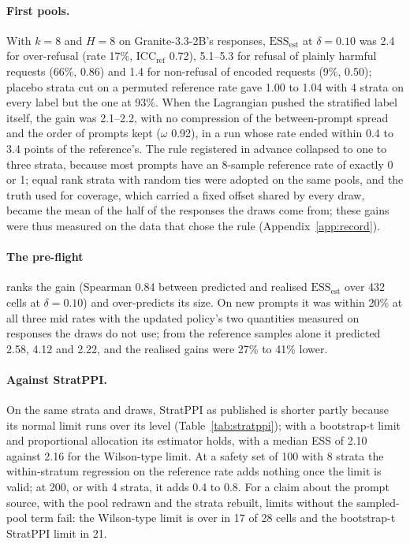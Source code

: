 \paragraph{First pools.} With $k=8$ and $H=8$ on Granite-3.3-2B's responses, $\mathrm{ESS}_{\text{est}}$ at $\delta=0.10$
was 2.4 for over-refusal (rate 17\%, $\mathrm{ICC}_{\text{ref}}$ 0.72), 5.1--5.3 for refusal of plainly harmful requests
(66\%, 0.86) and 1.4 for non-refusal of encoded requests (9\%, 0.50); placebo strata cut on a permuted reference rate gave
1.00 to 1.04 with 4 strata on every label but the one at 93\%. When the Lagrangian pushed the stratified label itself,
the gain was 2.1--2.2, with no compression of the between-prompt spread and the order of prompts kept ($\omega$ 0.92),
in a run whose rate ended within 0.4 to 3.4 points of the reference's. The rule registered in advance collapsed to one to
three strata, because most prompts have an 8-sample reference rate of exactly 0 or 1; equal rank strata with random ties
were adopted on the same pools, and the truth used for coverage, which carried a fixed offset shared by every draw,
became the mean of the half of the responses the draws come from; these gains were thus measured on the data that chose
the rule (Appendix~\ref{app:record}).

\paragraph{The pre-flight} ranks the gain (Spearman 0.84 between predicted and realised $\mathrm{ESS}_{\text{est}}$ over
432 cells at $\delta=0.10$) and over-predicts its size. On new prompts it was within 20\% at all three mid rates with the
updated policy's two quantities measured on responses the draws do not use; from the reference samples alone it
predicted 2.58, 4.12 and 2.22, and the realised gains were 27\% to 41\% lower.

\paragraph{Against StratPPI.} On the same strata and draws, StratPPI as published is shorter partly because its normal
limit runs over its level (Table~\ref{tab:stratppi}); with a bootstrap-t limit and proportional allocation its estimator
holds, with a median ESS of 2.10 against 2.16 for the Wilson-type limit. At a safety set of 100 with 8 strata the
within-stratum regression on the reference rate adds nothing once the limit is valid; at 200, or with 4 strata, it adds
0.4 to 0.8. For a claim about the prompt source, with the pool redrawn and the strata rebuilt, limits without the
sampled-pool term fail: the Wilson-type limit is over in 17 of 28 cells and the bootstrap-t StratPPI limit in 21.

